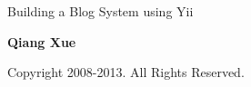 \thispagestyle{empty}
\begin{center}
		\bfseries \rule{0cm}{1.5cm} \Huge
		Building a Blog System using Yii
		 \vspace{1.5cm}
\end{center}

\begin{center}
		\bfseries \Large Qiang Xue
\end{center}


\begin{center}
	 Copyright 2008-2013. All Rights Reserved.
\end{center}

\vfill

\pagebreak \thispagestyle{empty} \cleardoublepage
